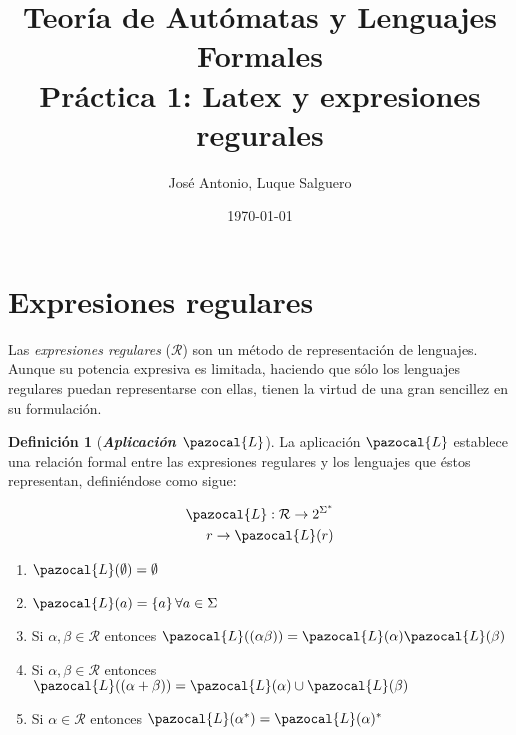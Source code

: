 \documentclass[10pt]{article}
\title{Teoría de Autómatas y Lenguajes Formales\\[.4\baselineskip]Práctica 1: Latex y expresiones regurales}
\author{José Antonio, Luque Salguero}
\date{\today}
\newcommand{\Lb}{\pazocal{L}}
\theoremstyle{plain}
\theoremstyle{definition}
\newtheorem{definition}{Definición}[section]
\begin{document}
\maketitle

\section{Expresiones regulares}

Las \textit{expresiones regulares} ($\mathcal{R}$) son un método de representación de
lenguajes. Aunque su potencia expresiva es limitada, haciendo que sólo los
lenguajes regulares puedan representarse con ellas, tienen la virtud de una gran
sencillez en su formulación.


\begin{definition}[\textbf{\textit{Aplicación $\Lb$}}]\label{def:aplicL}
	La aplicación $\Lb$ establece una relación formal entre las expresiones regulares y los lenguajes que éstos representan, definiéndose como sigue:
  \begin{ceqn}	%
    \begin{align*} %
    \Lb: \mathcal{R} \rightarrow 2^{\Sigma^*}\\ 
    r \rightarrow \Lb(r)
    \end{align*} 
  \end{ceqn} 
  
\begin{enumerate}[label=\alph{enumi})]
  \item $\Lb(\emptyset)=\emptyset$ 
  \item $\Lb(a)=\{a\} \, \forall a\in\Sigma$ 
  \item Si $\alpha,\beta \in \mathcal{R}$ entonces $\Lb((\alpha\beta))=\Lb(\alpha)\Lb(\beta)$
  \item Si $\alpha,\beta \in \mathcal{R}$ entonces $\Lb((\alpha+\beta))=\Lb(\alpha)\cup \Lb(\beta)$
  \item Si $\alpha \in \mathcal{R}$ entonces $\Lb(\alpha^*)=\Lb(\alpha)^*$
\end{enumerate}

\end{definition}
\end{document}
